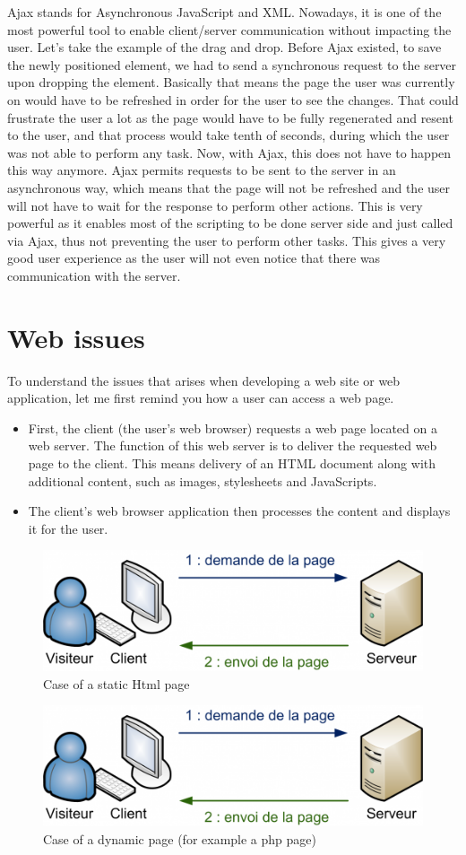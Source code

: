 Ajax stands for Asynchronous JavaScript and XML. Nowadays, it is one of the most powerful tool to enable client/server communication without impacting the user. Let's take the example of the drag and drop. Before Ajax existed, to save the newly positioned element, we had to send a synchronous request to the server upon dropping the element. Basically that means the page the user was currently on would have to be refreshed in order for the user to see the changes. That could frustrate the user a lot as the page would have to be fully regenerated and resent to the user, and that process would take tenth of seconds, during which the user was not able to perform any task. Now, with Ajax, this does not have to happen this way anymore. Ajax permits requests to be sent to the server in an asynchronous way, which means that the page will not be refreshed and the user will not have to wait for the response to perform other actions. This is very powerful as it enables most of the scripting to be done server side and just called via Ajax, thus not preventing the user to perform other tasks. This gives a very good user experience as the user will not even notice that there was communication with the server.

\section{Web issues}

To understand the issues that arises when developing a web site or web application, let me first remind you how a user can access a web page.
\begin{itemize}
\item First, the client (the user's web browser) requests a web page located on a web server. The function of this web server is to deliver the requested web page to the client. This means delivery of an HTML document along with additional content, 
such as images, stylesheets and JavaScripts.
\item The client's web browser application then processes the content and displays it for the user.  
\end{itemize}

\begin{figure}[!l]
\centering
\includegraphics[width=.55\textwidth]{img/static.png}
\caption{Case of a static Html page}
\label{figure:static page}
\end{figure}
\begin{figure}[!r]
\centering
\includegraphics[width=.55\textwidth]{img/static.png}
\caption{Case of a dynamic page (for example a php page)}
\label{figure:dynamic page}
\end{figure}

